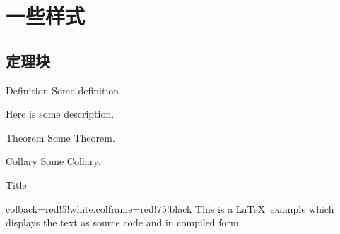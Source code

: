 \section{一些样式}


\subsection{定理块}

\begin{frame}
    \begin{defn}{Definition}{}
    Some definition\supercite{WHU-Beamer}.
    \end{defn}
    Here is some description.
    \begin{theo}{Theorem}{}
    Some Theorem.
    \end{theo}
    \begin{coro}{Collary}{}
        Some Collary.
    \end{coro}
    
\end{frame}


\begin{frame}
    
\end{frame}


\begin{frame}[fragile]{Title}
    \begin{tcblisting}{colback=red!5!white,colframe=red!75!black}
        This is a \LaTeX\ example which displays the text as source code
        and in compiled form.
    \end{tcblisting}
\end{frame}


